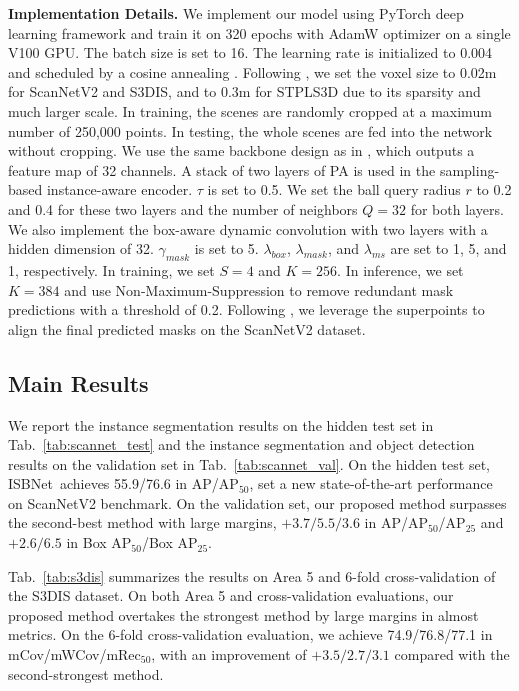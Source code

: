 \documentclass[10pt,twocolumn,letterpaper]{article}
\def\Approach{ISBNet}
\begin{document}
\noindent\textbf{Implementation Details.}
We implement our model using PyTorch deep learning framework \cite{paszke2017automatic} and train it on 320 epochs with AdamW optimizer on a single V100 GPU. The batch size is set to 16. The learning rate is initialized to 0.004 and scheduled by a cosine annealing \cite{zhang2021point}. Following \cite{vu2022softgroup}, we set the voxel size to 0.02m for ScanNetV2 and S3DIS, and to 0.3m for STPLS3D due to its sparsity and much larger scale. In training, the scenes are randomly cropped at a maximum number of 250,000 points. In testing, the whole scenes are fed into the network without cropping. 
We use the same backbone design as in \cite{vu2022softgroup}, which outputs a feature map of 32 channels. A stack of two layers of PA is used in the sampling-based instance-aware encoder. $\tau$ is set to 0.5. We set the ball query radius $r$ to 0.2 and 0.4 for these two layers and the number of neighbors $Q=32$ for both layers. 
We also implement the box-aware dynamic convolution with two layers with a hidden dimension of 32. $\gamma_{mask}$ is set to 5. $\lambda_{box}$, $\lambda_{mask}$, and $\lambda_{ms}$ are set to 1, 5, and 1, respectively.
In training, we set $S=4$ and $K=256$. In inference, we set $K=384$ and use Non-Maximum-Suppression to remove redundant mask predictions with a threshold of 0.2. Following \cite{han2020occuseg,liang2021instance,wu2022dknet}, we leverage the superpoints \cite{landrieu2018large,landrieu2019point} to align the final predicted masks on the ScanNetV2 dataset.

\subsection{Main Results}

 We report the instance segmentation results on the hidden test set in Tab.~\ref{tab:scannet_test} and the instance segmentation and object detection results on the validation set in Tab.~\ref{tab:scannet_val}. On the hidden test set, \Approach~achieves 55.9/76.6 in AP/AP$_{50}$, set a new state-of-the-art performance on ScanNetV2 benchmark. On the validation set, our proposed method surpasses the second-best method with large margins, $+3.7/5.5/3.6$ in AP/AP$_{50}$/AP$_{25}$ and $+2.6/6.5$ in Box AP$_{50}$/Box AP$_{25}$.

 Tab.~\ref{tab:s3dis} summarizes the results on Area 5 and 6-fold cross-validation of the S3DIS dataset. On both Area 5 and cross-validation evaluations, our proposed method overtakes the strongest method by large margins in almost metrics. On the 6-fold cross-validation evaluation, we achieve 74.9/76.8/77.1 in mCov/mWCov/mRec$_{50}$, with an improvement of 
$+3.5/2.7/3.1$ compared with the second-strongest method.
\end{document}

